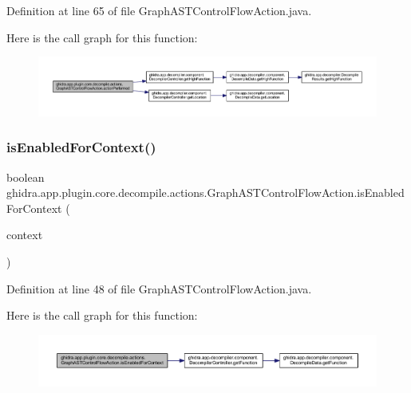 Definition at line 65 of file Graph\+A\+S\+T\+Control\+Flow\+Action.\+java.

Here is the call graph for this function\+:
\nopagebreak
\begin{figure}[H]
\begin{center}
\leavevmode
\includegraphics[width=350pt]{classghidra_1_1app_1_1plugin_1_1core_1_1decompile_1_1actions_1_1_graph_a_s_t_control_flow_action_ae1224abf771e50719a814edb0112c5bd_cgraph}
\end{center}
\end{figure}
\mbox{\label{classghidra_1_1app_1_1plugin_1_1core_1_1decompile_1_1actions_1_1_graph_a_s_t_control_flow_action_ad6faa00a21c3961a1bf9f683112704b2}} 
\subsubsection{\texorpdfstring{isEnabledForContext()}{isEnabledForContext()}}
{\footnotesize\ttfamily boolean ghidra.\+app.\+plugin.\+core.\+decompile.\+actions.\+Graph\+A\+S\+T\+Control\+Flow\+Action.\+is\+Enabled\+For\+Context (\begin{DoxyParamCaption}\item[{Action\+Context}]{context }\end{DoxyParamCaption})\hspace{0.3cm}{\ttfamily [inline]}}



Definition at line 48 of file Graph\+A\+S\+T\+Control\+Flow\+Action.\+java.

Here is the call graph for this function\+:
\nopagebreak
\begin{figure}[H]
\begin{center}
\leavevmode
\includegraphics[width=350pt]{classghidra_1_1app_1_1plugin_1_1core_1_1decompile_1_1actions_1_1_graph_a_s_t_control_flow_action_ad6faa00a21c3961a1bf9f683112704b2_cgraph}
\end{center}
\end{figure}


